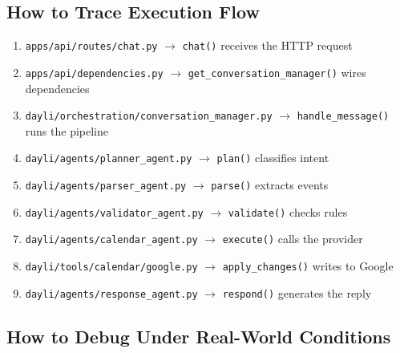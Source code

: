 \documentclass[12pt, a4paper]{article}
\begin{document}
\subsection{How to Trace Execution Flow}

\begin{enumerate}
  \item \texttt{apps/api/routes/chat.py} $\to$ \texttt{chat()} receives the HTTP request
  \item \texttt{apps/api/dependencies.py} $\to$ \texttt{get\_conversation\_manager()} wires dependencies
  \item \texttt{dayli/orchestration/conversation\_manager.py} $\to$ \texttt{handle\_message()} runs the pipeline
  \item \texttt{dayli/agents/planner\_agent.py} $\to$ \texttt{plan()} classifies intent
  \item \texttt{dayli/agents/parser\_agent.py} $\to$ \texttt{parse()} extracts events
  \item \texttt{dayli/agents/validator\_agent.py} $\to$ \texttt{validate()} checks rules
  \item \texttt{dayli/agents/calendar\_agent.py} $\to$ \texttt{execute()} calls the provider
  \item \texttt{dayli/tools/calendar/google.py} $\to$ \texttt{apply\_changes()} writes to Google
  \item \texttt{dayli/agents/response\_agent.py} $\to$ \texttt{respond()} generates the reply
\end{enumerate}

\subsection{How to Debug Under Real-World Conditions}
\end{document}

